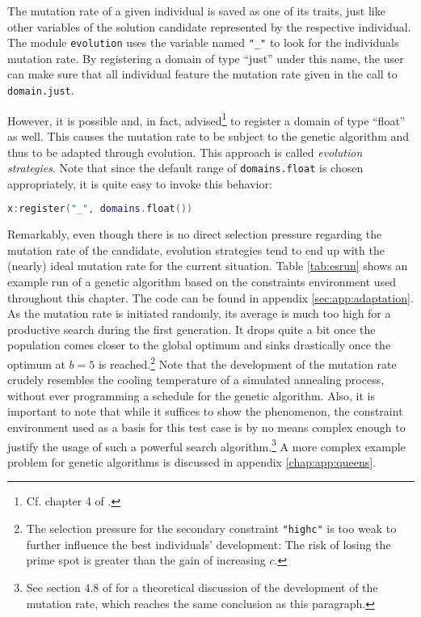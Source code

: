 The mutation rate of a given individual is saved as one of its traits, just like other variables of the solution candidate represented by the respective individual. The module \texttt{evolution} uses the variable named \texttt{"\_"} to look for the individuals mutation rate. By registering a domain of type ``just'' under this name, the user can make sure that all individual feature the mutation rate given in the call to \texttt{domain.just}.

However, it is possible and, in fact, advised\footnote{Cf. chapter 4 of \cite{EibenSmith2007}.} to register a domain of type ``float'' as well. This causes the mutation rate to be subject to the genetic algorithm and thus to be adapted through evolution. This approach is called \emph{evolution strategies}. Note that since the default range of \texttt{domains.float} is chosen appropriately, it is quite easy to invoke this behavior:

\begin{lstlisting}[language=lua, caption={Letting the genetic algorithm adapt the mutation rate.}, label=lst:floatmutationrate, name=lst:floatmutationrate]
x:register("_", domains.float())
\end{lstlisting}

Remarkably, even though there is no direct selection pressure regarding the mutation rate of the candidate, evolution strategies tend to end up with the (nearly) ideal mutation rate for the current situation. Table \ref{tab:esrun} shows an example run of a genetic algorithm based on the constraints environment used throughout this chapter. The code can be found in appendix \ref{sec:app:adaptation}. As the mutation rate is initiated randomly, its average is much too high for a productive search during the first generation. It drops quite a bit once the population comes closer to the global optimum and sinks drastically once the optimum at $b=5$ is reached.\footnote{The selection pressure for the secondary constraint \texttt{"highc"} is too weak to further influence the best individuals' development: The risk of losing the prime spot is greater than the gain of increasing $c$.} Note that the development of the mutation rate crudely resembles the cooling temperature of a simulated annealing process, without ever programming a schedule for the genetic algorithm. Also, it is important to note that while it suffices to show the phenomenon, the constraint environment used as a basis for this test case is by no means complex enough to justify the usage of such a powerful search algorithm.\footnote{See section 4.8 of \cite{EibenSmith2007} for a theoretical discussion of the development of the mutation rate, which reaches the same conclusion as this paragraph.} A more complex example problem for genetic algorithms is discussed in appendix \ref{chap:app:queens}.

